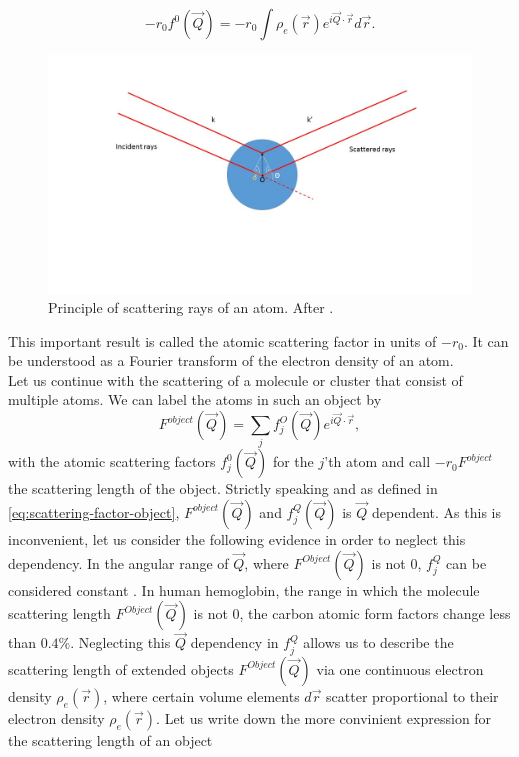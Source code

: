 \begin{equation}
-r_{0} f^{0}\left(\vec{Q}\right)=-r_{0}\int\rho_{e}\left(\vec{r}\right)e^{i \vec{Q}\cdot \vec{r}}d\vec{r}.
\label{eq:scattering-integral}
\end{equation}
\begin{figure}
	\centering
		\includegraphics[width=1.00\textwidth]{images/X-ray-scattering.jpg}
	\caption[Principle of scattering rays of an atom.]{Principle of scattering rays of an atom. After \cite{Als-Nielson-2011-JWS,Guinier-1955-JWS}.}
	\label{fig:X-ray-scattering}
\end{figure}
This important result is called the atomic scattering factor in units of $-r_{0}$. It can be understood as a Fourier transform of the electron density of an atom.\\
Let us continue with the scattering of a molecule or cluster that consist of multiple atoms. We can label the atoms in such an object by
\begin{equation}
F^{object}\left(\vec{Q}\right)=\sum_{j}f_{j}^{O}\left(\vec{Q}\right)e^{i \vec{Q}\cdot \vec{r}},
\label{eq:scattering-factor-object}
\end{equation}
with the atomic scattering factors $f_{j}^{0}\left(\vec{Q}\right)$ for the $j$'th atom and call $-r_{0} F^{object}$ the scattering length of the object. Strictly speaking and as defined in \eqref{eq:scattering-factor-object}, $F^{object}\left(\vec{Q}\right)$ and $f_{j}^{Q}\left(\vec{Q}\right)$ is $\vec{Q}$ dependent. As this is inconvenient, let us consider the following evidence in order to neglect this dependency. In the angular range of $\vec{Q}$, where $F^{Object}\left(\vec{Q}\right)$ is not 0, $f_{j}^{Q}$ can be considered constant \citep[see][p. 6-7]{Guinier-1955-JWS}. In human hemoglobin, the range in which the molecule scattering length $F^{Object}\left(\vec{Q}\right)$ is not 0, the carbon atomic form factors change less than $0.4$\%. Neglecting this $\vec{Q}$ dependency in $f_{j}^{Q}$ allows us to describe the scattering length of extended objects $F^{Object}\left(\vec{Q}\right)$ via one continuous electron density $\rho_{e}\left(\vec{r}\right)$, where certain volume elements $d\vec{r}$ scatter proportional to their electron density $\rho_{e}\left(\vec{r}\right)$. Let us write down the more convinient expression for the scattering length of an object
